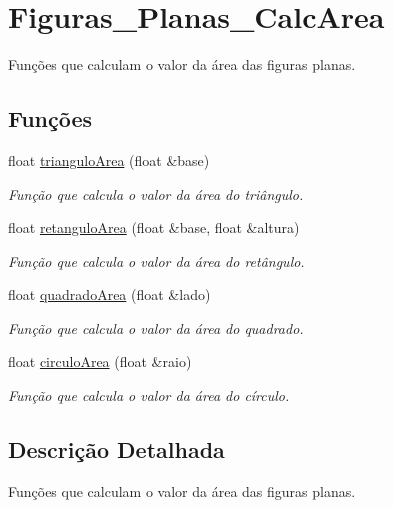 \hypertarget{group__Figuras__Planas__CalcArea}{}\section{Figuras\+\_\+\+Planas\+\_\+\+Calc\+Area}
\label{group__Figuras__Planas__CalcArea}


Funções que calculam o valor da área das figuras planas.  


\subsection*{Funções}
\begin{DoxyCompactItemize}
\item 
float \hyperlink{group__Figuras__Planas__CalcArea_gad3dd4559c961d21265a1fe46e7d5c3cc}{triangulo\+Area} (float \&base)
\begin{DoxyCompactList}\small\item\em Função que calcula o valor da área do triângulo. \end{DoxyCompactList}\item 
float \hyperlink{group__Figuras__Planas__CalcArea_gaadec7ea7b857fb93862af9da30f4b896}{retangulo\+Area} (float \&base, float \&altura)
\begin{DoxyCompactList}\small\item\em Função que calcula o valor da área do retângulo. \end{DoxyCompactList}\item 
float \hyperlink{group__Figuras__Planas__CalcArea_gac85a6a6234680349b5b8329d4333567e}{quadrado\+Area} (float \&lado)
\begin{DoxyCompactList}\small\item\em Função que calcula o valor da área do quadrado. \end{DoxyCompactList}\item 
float \hyperlink{group__Figuras__Planas__CalcArea_gac50529a5e8458336df0f0e2329e49833}{circulo\+Area} (float \&raio)
\begin{DoxyCompactList}\small\item\em Função que calcula o valor da área do círculo. \end{DoxyCompactList}\end{DoxyCompactItemize}


\subsection{Descrição Detalhada}
Funções que calculam o valor da área das figuras planas. 



